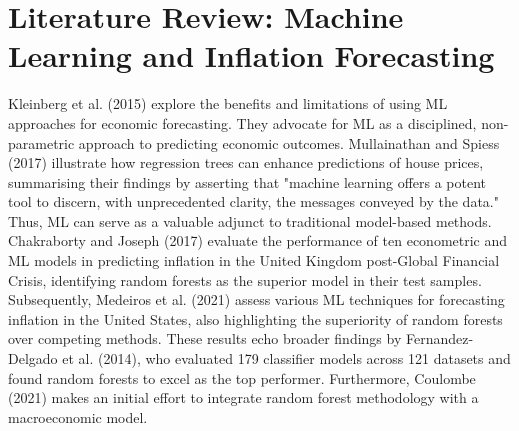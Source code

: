 \pagebreak
\section{Literature Review: Machine Learning and Inflation Forecasting} \label{sec:lit}


Kleinberg et al. (2015) explore the benefits and limitations of using ML approaches for economic forecasting. They advocate for ML as a disciplined, non-parametric approach to predicting economic outcomes. Mullainathan and Spiess (2017) illustrate how regression trees can enhance predictions of house prices, summarising their findings by asserting that "machine learning offers a potent tool to discern, with unprecedented clarity, the messages conveyed by the data." Thus, ML can serve as a valuable adjunct to traditional model-based methods. Chakraborty and Joseph (2017) evaluate the performance of ten econometric and ML models in predicting inflation in the United Kingdom post-Global Financial Crisis, identifying random forests as the superior model in their test samples. Subsequently, Medeiros et al. (2021) assess various ML techniques for forecasting inflation in the United States, also highlighting the superiority of random forests over competing methods. These results echo broader findings by Fernandez-Delgado et al. (2014), who evaluated 179 classifier models across 121 datasets and found random forests to excel as the top performer. Furthermore, Coulombe (2021) makes an initial effort to integrate random forest methodology with a macroeconomic model.